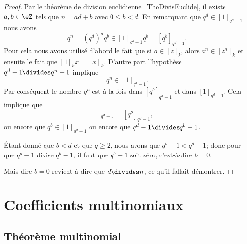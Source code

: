 \begin{proof}
	Par le théorème de division euclidienne~\ref{ThoDivisEuclide}, il existe \( a,b\in \eZ\) tels que \( n=ad+b\) avec \( 0\leq b<d\). En remarquant que \( q^d\in[1]_{q^d-1}\) nous avons
	\begin{equation}
		q^n=(q^d)^aq^b\in[1]_{q^d-1}q^b=[q^b]_{q^d-1}.
	\end{equation}
	Pour cela nous avons utilisé d'abord le fait que si \( a\in [z]_k\), alors \( a^n\in[z^n]_k\) et ensuite le fait que \( [1]_kx=[x]_k\). D'autre part l'hypothèse \( q^d-1\divides q^n-1\) implique
	\begin{equation}
		q^n\in[1]_{q^d-1}.
	\end{equation}
	Par conséquent le nombre \( q^n\) est à la fois dans \( [q^b]_{q^d-1}\) et dans \( [1]_{q^d-1}\). Cela implique que
	\begin{equation}
		[1]_{q^d-1}=[q^b]_{q^d-1},
	\end{equation}
	ou encore que \( q^b\in[1]_{q^d-1}\) ou encore que \( q^d-1\divides q^b-1\).

	Étant donné que \( b<d\) et que \( q\geq 2\), nous avons que \( q^b-1<q^d-1\); donc pour que \( q^d-1\) divise \( q^b-1\), il faut que \( q^b-1\) soit zéro, c'est-à-dire \( b=0\).

	Mais dire \( b=0\) revient à dire que \( d\divides n\), ce qu'il fallait démontrer.
\end{proof}



\section{Coefficients multinomiaux}


\subsection{Théorème multinomial}

